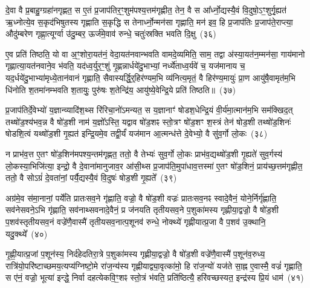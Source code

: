 {\anuvakamend[{द॒भ्नो॒त्यन॑भिषुतस्य गृह्णा॒त्येका॒न्नविꣳ॑श॒तिश्च॑}]}%

दे॒वा वै प्र॒बाहु॒ग्ग्रहा॑नगृह्णत॒ स ए॒तं प्र॒जा\-प॑तिर॒ꣳ॒शुम॑पश्य॒त्तम॑गृह्णीत॒ तेन॒ वै स आ᳚र्ध्नो॒द्यस्यै॒वं वि॒दुषो॒\-ऽꣳ॒शुर्गृ॒ह्यत॑ ऋ॒ध्नोत्ये॒व स॒कृद॑भिषुतस्य गृह्णाति स॒कृद्धि स तेनार्ध्नो॒न्मन॑सा गृह्णाति॒ मन॑ इव॒ हि प्र॒जा\-प॑तिः प्र॒जाप॑ते॒राप्त्या॒ औदु॑म्बरेण गृह्णा॒त्यूर्ग्वा उ॑दु॒म्बर॒ ऊर्ज॑मे॒वाव॑ रुन्धे॒ चतुः॑स्रक्ति भवति दि॒क्षु~(३६)

ए॒व प्रति॑ तिष्ठति॒ यो वा अ॒ꣳ॒शोरा॒यत॑नं॒ वेदा॒यत॑नवान्भवति वामदे॒व्यमिति॒ साम॒ तद्वा अ॑स्या॒यत॑न॒म्मन॑सा॒ गाय॑मानो गृह्णात्या॒यत॑नवाने॒व भ॑वति॒ यद॑ध्व॒र्युर॒ꣳ॒शुं गृ॒ह्णन्नार्धये॑दु॒भाभ्यां॒ नर्ध्ये॑ताध्व॒र्यवे॑ च॒ यज॑मानाय च॒ यद॒र्धये॑दु॒भाभ्या॑मृध्ये॒तान॑वानं गृह्णाति॒ सैवास्यर्द्धि॒र्॒\mbox{}हिर॑ण्यम॒भि व्य॑नित्य॒मृतं॒ वै हिर॑ण्य॒मायुः॑ प्रा॒ण आयु॑षै॒वामृत॑म॒भि धि॑नोति श॒तमा॑नम्भवति श॒तायुः॒ पुरु॑षः श॒तेन्द्रि॑य॒ आयु॑ष्ये॒वेन्द्रि॒ये प्रति॑ तिष्ठति॥~(३७)

{\anuvakamend[{दि॒क्ष्व॑निति विꣳश॒तिश्च॑}]}%

प्र॒जा\-प॑तिर्दे॒वेभ्यो॑ य॒ज्ञान्व्यादि॑श॒थ्स रि॑रिचा॒नो॑\-ऽमन्यत॒ स य॒ज्ञानाꣳ॑ षोडश॒धेन्द्रि॒यं वी॒र्य॑मा॒त्मान॑म॒भि सम॑क्खिद॒त् तथ्षो॑ड॒श्य॑भव॒न्न वै षो॑ड॒शी नाम॑ य॒ज्ञो᳚\-ऽस्ति॒ यद्वाव षो॑ड॒शꣴ स्तो॒त्रꣳ षो॑ड॒शꣳ श॒स्त्रं तेन॑ षोड॒शी तथ्षो॑ड॒शिनः॑ षोडशि॒त्वं यथ्षो॑ड॒शी गृ॒ह्यत॑ इन्द्रि॒यमे॒व तद्वी॒र्यं॑ यज॑मान आ॒त्मन्ध॑त्ते दे॒वेभ्यो॒ वै सु॑व॒र्गो लो॒कः~(३८)

न प्राभ॑व॒त्त ए॒तꣳ षो॑ड॒शिन॑मपश्य॒न्तम॑गृह्णत॒ ततो॒ वै तेभ्यः॑ सुव॒र्गो लो॒कः प्राभ॑व॒द्यथ्षो॑ड॒शी गृ॒ह्यते॑ सुव॒र्गस्य॑ लो॒कस्या॒भिजि॑त्या॒ इन्द्रो॒ वै दे॒वाना॑मानुजाव॒र आ॑सी॒थ्स प्र॒जा\-प॑ति॒मुपा॑धाव॒त्तस्मा॑ ए॒तꣳ षो॑ड॒शिनं॒ प्राय॑च्छ॒त्तम॑गृह्णीत॒ ततो॒ वै सो\-ऽग्रं॑ दे॒वता॑नां॒ पर्यै॒द्यस्यै॒वं वि॒दुषः॑ षोड॒शी गृ॒ह्यते᳚~(३९)

अग्र॑मे॒व स॑मा॒नानां॒ पर्ये॑ति प्रातःसव॒ने गृ॑ह्णाति॒ वज्रो॒ वै षो॑ड॒शी वज्रः॑ प्रातःसव॒नꣴ स्वादे॒वैनं॒ योने॒र्निर्गृ॑ह्णाति॒ सव॑नेसवने॒\-ऽभि गृ॑ह्णाति॒ सव॑नाथ्सवनादे॒वैनं॒ प्र ज॑नयति तृतीयसव॒ने प॒शुका॑मस्य गृह्णीया॒द्वज्रो॒ वै षो॑ड॒शी प॒शव॑स्तृतीयसव॒नं वज्रे॑णै॒वास्मै॑ तृतीयसव॒नात्प॒शूनव॑ रुन्धे॒ नोक्थ्ये॑ गृह्णीयात्प्र॒जा वै प॒शव॑ उ॒क्थानि॒ यदु॒क्थ्ये᳚~(४०)

गृ॒ह्णी॒यात्प्र॒जां प॒शून॑स्य॒ निर्द॑हेदतिरा॒त्रे प॒शुका॑मस्य गृह्णीया॒द्वज्रो॒ वै षो॑ड॒शी वज्रे॑णै॒वास्मै॑ प॒शून॑व॒रुध्य॒ रात्रि॑यो॒परि॑ष्टाच्छमय॒त्यप्य॑ग्निष्टो॒मे रा॑ज॒न्य॑स्य गृह्णीयाद्व्या॒वृत्का॑मो॒ हि रा॑ज॒न्यो॑ यज॑ते सा॒ह्न ए॒वास्मै॒ वज्रं॑ गृह्णाति॒ स ए॑नं॒ वज्रो॒ भूत्या॑ इन्द्धे॒ निर्वा दहत्येकवि॒ꣳ॒शꣴ स्तो॒त्रं भ॑वति॒ प्रति॑ष्ठित्यै॒ हरि॑वच्छस्यत॒ इन्द्र॑स्य प्रि॒यं धाम॑~(४१)

